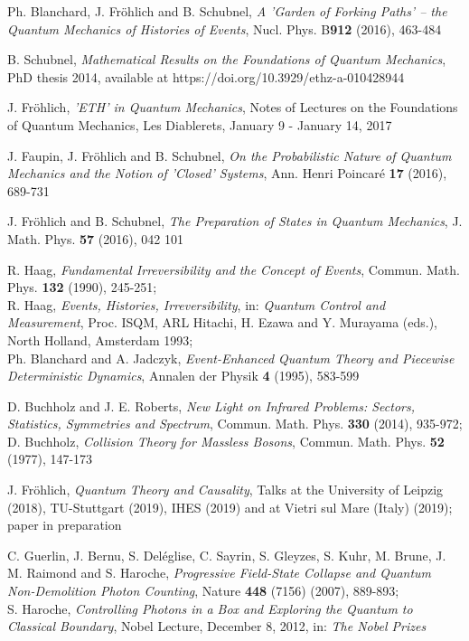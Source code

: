 \documentclass[12pt]{article}
\begin{document}
\begin{thebibliography}{References}
 Ph. Blanchard, J. Fr\"{o}hlich and B. Schubnel, \textit{A 'Garden of Forking Paths' -- the Quantum Mechanics of Histories of Events}, Nucl. Phys. B{{\bf912}} (2016), 463-484

 B. Schubnel, \textit{Mathematical Results on the Foundations of Quantum Mechanics}, PhD thesis 2014, available at https://doi.org/10.3929/ethz-a-010428944

 J. Fr\"{o}hlich, \textit{ 'ETH' in Quantum Mechanics}, Notes of Lectures on the Foundations of Quantum Mechanics, Les Diablerets, January 9 - January 14, 2017

 J. Faupin, J. Fr\"{o}hlich and B. Schubnel, \textit{On the Probabilistic Nature of Quantum Mechanics and the Notion of 'Closed' Systems}, Ann. Henri Poincar\'e {\bf{17}} (2016), 689-731

 J. Fr\"{o}hlich and B. Schubnel, \textit{The Preparation of States in Quantum Mechanics}, J. Math. Phys. {\bf{57}} (2016), 042 101

 R. Haag, \textit{Fundamental Irreversibility and the Concept of Events}, Commun. Math. Phys. {\bf{132}} (1990), 245-251;\\
R. Haag, \textit{Events, Histories, Irreversibility}, in: \textit{Quantum Control and Measurement}, Proc. ISQM, ARL Hitachi, H. Ezawa and Y. Murayama (eds.), North Holland, Amsterdam 1993;\\
Ph. Blanchard and A. Jadczyk, \textit{Event-Enhanced Quantum Theory and Piecewise Deterministic Dynamics}, Annalen der Physik {\bf{4}} (1995), 583-599

 D. Buchholz and J. E. Roberts, \textit{New Light on Infrared Problems: Sectors, Statistics, Symmetries and Spectrum}, Commun. Math. Phys. {\bf{330}} (2014), 935-972;\\
D. Buchholz, \textit{Collision Theory for Massless Bosons}, Commun. Math. Phys. {\bf{52}} (1977), 147-173

 J. Fr\"{o}hlich, \textit{Quantum Theory and Causality}, Talks at the University of Leipzig (2018), TU-Stuttgart (2019), IHES (2019) and at Vietri sul Mare (Italy) (2019); paper in preparation

 C. Guerlin, J. Bernu, S. Del\'eglise, C. Sayrin, S. Gleyzes, S. Kuhr, M. Brune, J. M. Raimond and S. Haroche, \textit{Progressive Field-State Collapse and Quantum Non-Demolition Photon Counting}, Nature {\bf{448}} (7156) (2007), 889-893;\\
S. Haroche, \textit{Controlling Photons in a Box and Exploring the Quantum to Classical Boundary}, Nobel Lecture, December 8, 2012, in: \textit{The Nobel Prizes}


\end{thebibliography}
\end{document}

